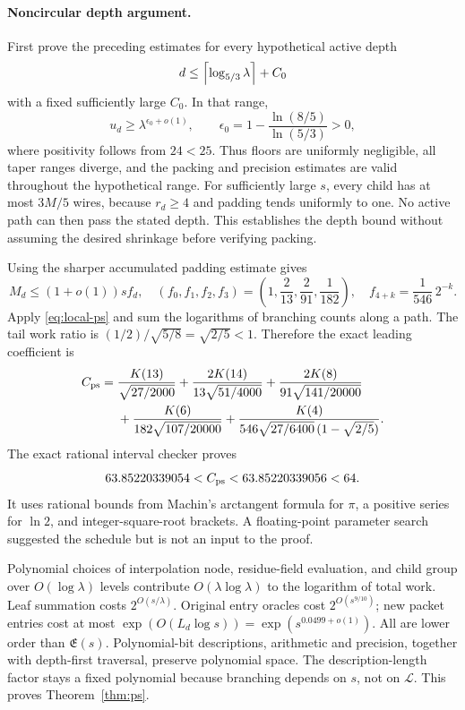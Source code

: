 \paragraph{Noncircular depth argument.}
First prove the preceding estimates for every hypothetical active depth
\[
 d\le\left\lceil\log_{5/3}\lambda\right\rceil+C_0
\]
with a fixed sufficiently large $C_0$. In that range,
\[
 u_d\ge\lambda^{\epsilon_0+o(1)},\qquad
 \epsilon_0=1-\frac{\ln(8/5)}{\ln(5/3)}>0,
\]
where positivity follows from $24<25$. Thus floors are uniformly
negligible, all taper ranges diverge, and the packing and precision
estimates are valid throughout the hypothetical range. For sufficiently
large $s$, every child has at most $3M/5$ wires, because $r_d\ge4$ and
padding tends uniformly to one. No active path can then pass the stated
depth. This establishes the depth bound without assuming the desired
shrinkage before verifying packing.

Using the sharper accumulated padding estimate gives
\begin{equation}\label{eq:ps-size}
 M_d\le(1+o(1))s f_d,
 \quad (f_0,f_1,f_2,f_3)=\left(1,\frac2{13},\frac2{91},\frac1{182}\right),
 \quad f_{4+k}=\frac1{546}\,2^{-k}.
\end{equation}
Apply \eqref{eq:local-ps} and sum the logarithms of branching counts along
a path. The tail work ratio is
$(1/2)/\sqrt{5/8}=\sqrt{2/5}<1$. Therefore the exact leading coefficient is
\begin{align}
 C_{\rm ps}={}&\frac{K(13)}{\sqrt{27/2000}}
 +\frac{2K(14)}{13\sqrt{51/4000}}
 +\frac{2K(8)}{91\sqrt{141/20000}}\notag\\
 &+\frac{K(6)}{182\sqrt{107/20000}}
 +\frac{K(4)}{546\sqrt{27/6400}\,(1-\sqrt{2/5})}.
 \label{eq:ps-constant}
\end{align}
The exact rational interval checker proves
\begin{equation}\label{eq:ps-interval}
 63.85220339054<C_{\rm ps}<63.85220339056<64.
\end{equation}
It uses rational bounds from Machin's arctangent formula for $\pi$, a
positive series for $\ln2$, and integer-square-root brackets. A
floating-point parameter search suggested the schedule but is not an
input to the proof.

Polynomial choices of interpolation node, residue-field evaluation, and
child group over $O(\log\lambda)$ levels contribute
$O(\lambda\log\lambda)$ to the logarithm of total work. Leaf summation
costs $2^{O(s/\lambda)}$. Original entry oracles cost
$2^{O(s^{9/10})}$; new packet entries cost at most
$\exp(O(L_d\log s))=\exp(s^{0.0499+o(1)})$. All are lower order than
$\mathfrak E(s)$. Polynomial-bit descriptions, arithmetic and precision,
together with depth-first traversal, preserve polynomial space. The
description-length factor stays a fixed polynomial because branching
depends on $s$, not on $\mathcal L$. This proves
Theorem~\ref{thm:ps}.

